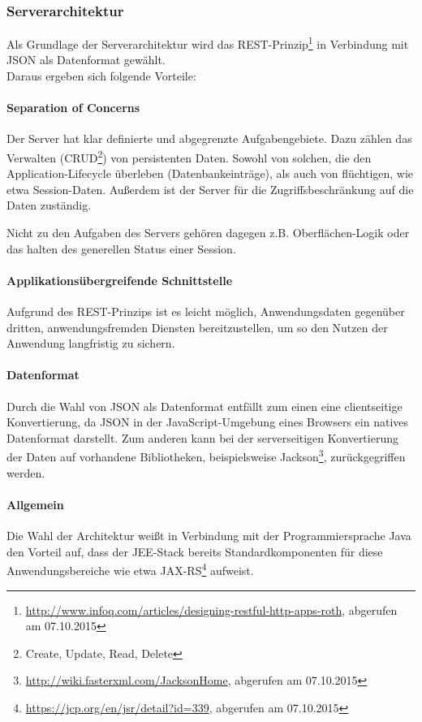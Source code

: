 \documentclass[12pt, xcolor=dvipsnames]{scrartcl}
\begin{document}
\subsubsection{Serverarchitektur}

Als Grundlage der Serverarchitektur wird das
REST-Prinzip\footnote{\url{http://www.infoq.com/articles/designing-restful-http-apps-roth}, abgerufen am 07.10.2015} 
in Verbindung mit JSON als Datenformat gewählt. \\

Daraus ergeben sich folgende Vorteile:

\paragraph{Separation of Concerns}
Der Server hat klar definierte und abgegrenzte Aufgabengebiete. Dazu zählen das Verwalten
(CRUD\footnote{Create, Update, Read, Delete}) von persistenten Daten. Sowohl von solchen, die den Application-Lifecycle überleben (Datenbankeinträge), als auch von flüchtigen, wie etwa Session-Daten. Außerdem ist der Server für die Zugriffsbeschränkung auf die Daten zuständig.

Nicht zu den Aufgaben des Servers gehören dagegen z.B. Oberflächen-Logik oder das halten des generellen Status einer Session.

\paragraph{Applikationsübergreifende Schnittstelle}
Aufgrund des REST-Prinzips ist es leicht möglich, Anwendungsdaten gegenüber dritten, anwendungsfremden Diensten bereitzustellen, um so den Nutzen der Anwendung langfristig zu sichern.

\paragraph{Datenformat}
Durch die Wahl von JSON als Datenformat entfällt zum einen eine clientseitige Konvertierung, da JSON in der JavaScript-Umgebung eines Browsers ein natives Datenformat darstellt. Zum anderen kann bei der serverseitigen Konvertierung der Daten auf vorhandene Bibliotheken, beispielsweise
Jackson\footnote{\url{http://wiki.fasterxml.com/JacksonHome}, abgerufen am 07.10.2015},
zurückgegriffen werden.

\paragraph{Allgemein}
Die Wahl der Architektur weißt in Verbindung mit der Programmiersprache Java den Vorteil auf, dass der JEE-Stack bereits Standardkomponenten für diese Anwendungsbereiche wie etwa
JAX-RS\footnote{\url{https://jcp.org/en/jsr/detail?id=339}, abgerufen am 07.10.2015}
aufweist.
\end{document}
